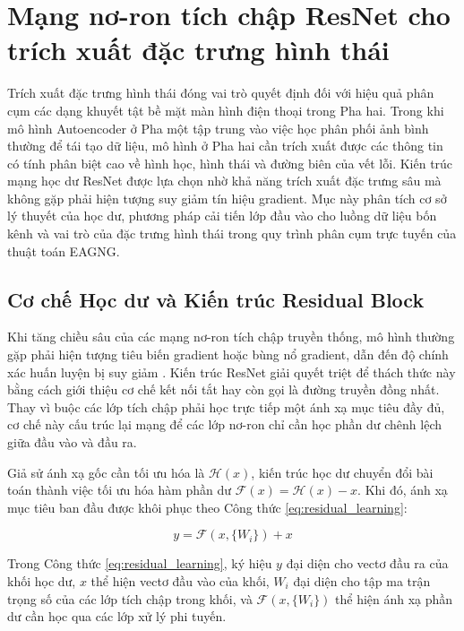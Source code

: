 \section{Mạng nơ-ron tích chập ResNet cho trích xuất đặc trưng hình thái}

Trích xuất đặc trưng hình thái đóng vai trò quyết định đối với hiệu quả phân cụm các dạng khuyết tật bề mặt màn hình điện thoại trong Pha hai. Trong khi mô hình Autoencoder ở Pha một tập trung vào việc học phân phối ảnh bình thường để tái tạo dữ liệu, mô hình ở Pha hai cần trích xuất được các thông tin có tính phân biệt cao về hình học, hình thái và đường biên của vết lỗi. Kiến trúc mạng học dư ResNet được lựa chọn nhờ khả năng trích xuất đặc trưng sâu mà không gặp phải hiện tượng suy giảm tín hiệu gradient. Mục này phân tích cơ sở lý thuyết của học dư, phương pháp cải tiến lớp đầu vào cho luồng dữ liệu bốn kênh và vai trò của đặc trưng hình thái trong quy trình phân cụm trực tuyến của thuật toán EAGNG.

\subsection{Cơ chế Học dư và Kiến trúc Residual Block}

Khi tăng chiều sâu của các mạng nơ-ron tích chập truyền thống, mô hình thường gặp phải hiện tượng tiêu biến gradient hoặc bùng nổ gradient, dẫn đến độ chính xác huấn luyện bị suy giảm \cite{he2016deep}. Kiến trúc ResNet giải quyết triệt để thách thức này bằng cách giới thiệu cơ chế kết nối tắt hay còn gọi là đường truyền đồng nhất. Thay vì buộc các lớp tích chập phải học trực tiếp một ánh xạ mục tiêu đầy đủ, cơ chế này cấu trúc lại mạng để các lớp nơ-ron chỉ cần học phần dư chênh lệch giữa đầu vào và đầu ra.

Giả sử ánh xạ gốc cần tối ưu hóa là $\mathcal{H}(x)$, kiến trúc học dư chuyển đổi bài toán thành việc tối ưu hóa hàm phần dư $\mathcal{F}(x) = \mathcal{H}(x) - x$. Khi đó, ánh xạ mục tiêu ban đầu được khôi phục theo Công thức \ref{eq:residual_learning}:

\begin{equation}
y = \mathcal{F}(x, \{W_i\}) + x
\label{eq:residual_learning}
\end{equation}

Trong Công thức \ref{eq:residual_learning}, ký hiệu $y$ đại diện cho vectơ đầu ra của khối học dư, $x$ thể hiện vectơ đầu vào của khối, $W_i$ đại diện cho tập ma trận trọng số của các lớp tích chập trong khối, và $\mathcal{F}(x, \{W_i\})$ thể hiện ánh xạ phần dư cần học qua các lớp xử lý phi tuyến.

